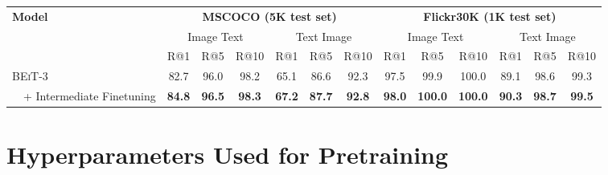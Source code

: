 \documentclass{article}
\newcommand\our{\textsc{BEiT-3}}
\begin{document}
\begin{table*}[h]
\centering
\small
\begin{tabular}{@{}l@{\hskip1pt} @{\hskip1pt}c@{ \hskip1pt} @{\hskip1pt}c@{ \hskip1pt} @{\hskip1pt}c@{ \hskip1pt} @{\hskip1pt}c@{ \hskip1pt} @{\hskip1pt}c@{ \hskip1pt} @{\hskip1pt}c@{ \hskip1pt} | @{ \hskip2pt}c@{ \hskip1pt} @{\hskip1pt}c@{ \hskip1pt} @{\hskip1pt}c@{ \hskip1pt} @{\hskip1pt}c@{ \hskip1pt} @{\hskip1pt}c@{ \hskip1pt} @{\hskip1pt}c@{} }
\toprule
\multirow{3}{*}{\bf Model} & \multicolumn{6}{c}{\bf MSCOCO (5K test set)} & \multicolumn{6}{c}{\bf Flickr30K (1K test set)} \\
 & \multicolumn{3}{c}{Image  Text} & \multicolumn{3}{c}{Text  Image} & \multicolumn{3}{c}{Image  Text} & \multicolumn{3}{c}{Text  Image} \\
 \cmidrule(lr){2-4} \cmidrule(lr){5-7} \cmidrule(lr){8-10} \cmidrule(lr){11-13}
 & R@1 & R@5 & R@10 & R@1 & R@5 & R@10 & R@1 & R@5 & R@10 & R@1 & R@5 & R@10 \\
\midrule
\our{} & 82.7 & 96.0 & 98.2 & 65.1 & 86.6 & 92.3 & 97.5 & 99.9 & 100.0 & 89.1 & 98.6 & 99.3 \\
~~+ Intermediate Finetuning & \bf 84.8 & \bf 96.5 & \bf 98.3 & \bf 67.2 & \bf 87.7 & \bf 92.8 & \bf 98.0 & \bf 100.0 & \bf 100.0 & \bf 90.3 & \bf 98.7 & \bf 99.5 \\
\bottomrule
\end{tabular}
\caption{Finetuning results of image-text retrieval on COCO and Flickr30K.
\our{} is directly finetuned on downstream benchmarks without intermediate finetuning on the pretraining data.
}
\label{tbl:results:finetuned_retrieval_woitcct}
\end{table*}


\section{Hyperparameters Used for Pretraining}
\end{document}
